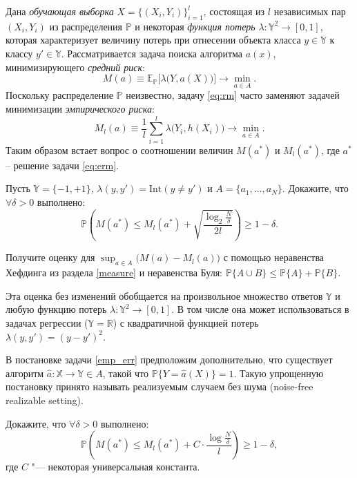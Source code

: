 \begin{comment}
НЕ ПОНЯЛ ПРИЧЕМ ЗДЕСЬ Джеймс - ЕСЛИ СТАТЬЯ 1956 года Стейна?
\end{comment}


\begin{problem}
\label{emp_err}
Дана {\it обучающая выборка} $X =\{(X_i,Y_i)\}_{i=1}^l$, состоящая из $l$ независимых пар $(X_i,Y_i)$ из распределения $\mathbb{P}$ и некоторая {\it функция потерь} $\lambda \colon \mathbb{Y}^2\to [0,1]$, которая характеризует величину потерь при отнесении объекта класса $y\in\mathbb{Y}$ к классу $y'\in\mathbb{Y}$.
Рассматривается задача поиска алгоритма  $a(x)$, минимизирующего {\it средний риск}:
\begin{equation}
\label{eq:rm}
M(a)\equiv\mathrm{\mathbb{E}_{\mathbb{P}}}\bigl[ \lambda\bigl(Y, a(X)\bigr) \bigr] \to \min_{a \in A}.
\end{equation}
Поскольку распределение $\mathbb{P}$ неизвестно, задачу \eqref{eq:rm} часто заменяют задачей минимизации {\it эмпирического риска}:
\begin{equation}
\label{eq:erm}
M_l(a)\equiv \frac{1}{l}\sum_{i=1}^l \lambda \bigl(Y_i, h(X_i)\bigr) \to \min_{a \in A}.
\end{equation}
Таким образом встает вопрос о соотношении величин $M(a^*)$ и $M_l(a^*)$, где $a^*$ -- решение задачи \eqref{eq:erm}.

Пусть $\mathbb{Y}=\{-1,+1\}$,  $\lambda(y,y')=\mathrm{Int}(y\neq y')$ и $A = \{a_1,\dots, a_N\}$.
Докажите, что $\forall \delta > 0$ выполнено:
\[
\mathbb{P} \left( M(a^*) \leqslant M_l(a^*) + \sqrt{\frac{\log_2{\frac{N}{\delta}}}{2l}} \right)  \geq 1-\delta.
\]
\end{problem}

\begin{ordre}
Получите оценку для $\sup_{a\in A}\bigl( M(a) - M_l(a)\bigr)$ с помощью неравенства Хефдинга из раздела \ref{measure} и неравенства Буля: $\mathbb{P}\{A\cup B\}\leqslant \mathbb{P}\{A\} + \mathbb{P}\{B\}$.
\end{ordre}

\begin{remark}
Эта оценка без изменений обобщается на произвольное множество ответов $\mathbb{Y}$ и любую функцию потерь $\lambda \colon \mathbb{Y}^2\to[0,1]$.
В том числе она может использоваться в задачах регрессии ($\mathbb{Y} = \mathbb{R}$) с квадратичной функцией потерь $\lambda(y,y') = (y - y')^2$.
\end{remark}

\begin{problem}
В постановке задачи \ref{emp_err} предположим дополнительно, что существует  алгоритм $\hat{a}\colon \mathbb{X}\to\mathbb{Y} \in A$, такой что $\mathbb{P}\{Y = \hat{a}(X)\} = 1$. Такую упрощенную постановку принято называть реализуемым случаем без шума (noise-free realizable setting).

Докажите, что $\forall \delta > 0$ выполнено:
\[
\mathbb{P} \left(
M(a^*) \leqslant M_l(a^*)+ C\cdot\frac{\log\frac{N}{\delta}}{l}
\right)
\geq 1-\delta,
\]
где $C$ "--- некоторая универсальная константа.

\end{problem}


